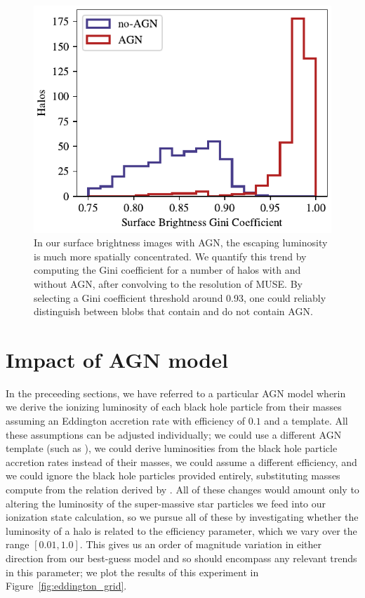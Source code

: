 \begin{figure}
    \centering
    \includegraphics[width=\textwidth,keepaspectratio]{figures/skew_distribution.pdf}
    \caption{
        In our surface brightness images with AGN, the escaping luminosity is much more spatially concentrated.
        We quantify this trend by computing the Gini coefficient for a number of halos with and without AGN, after convolving to the resolution of MUSE.
        By selecting a Gini coefficient threshold around 0.93, one could reliably distinguish between blobs that contain and do not contain AGN.
    }
    \label{fig:skewness}
\end{figure}


\section{Impact of AGN model}

In the preceeding sections, we have referred to a particular AGN model wherin we derive the ionizing luminosity of each black hole particle from their masses assuming an Eddington accretion rate with efficiency of $0.1$ and a \citet*{Hopkins2007} template.
All these assumptions can be adjusted individually; we could use a different AGN template (such as \citet{Nenkova2008}), we could derive luminosities from the black hole particle accretion rates instead of their masses, we could assume a different efficiency, and we could ignore the black hole particles provided entirely, substituting masses compute from the relation derived by \citet{Magorrian1998}.
All of these changes would amount only to altering the luminosity of the super-massive star particles we feed into our ionization state calculation, so we pursue all of these by investigating whether the luminosity of a halo is related to the efficiency parameter, which we vary over the range $[0.01, 1.0]$.
This gives us an order of magnitude variation in either direction from our best-guess model and so should encompass any relevant trends in this parameter; we plot the results of this experiment in Figure~\ref{fig:eddington_grid}.


